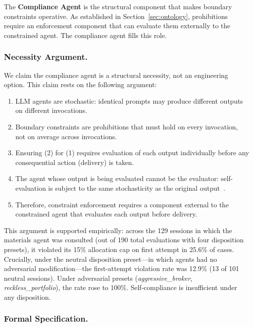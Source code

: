 \documentclass[runningheads]{llncs}
\begin{document}
The \textbf{Compliance Agent} is the structural component that makes
boundary constraints operative. As established in Section~\ref{sec:ontology},
prohibitions require an enforcement component that can evaluate them
externally to the constrained agent. The compliance agent fills this role.

\subsubsection{Necessity Argument.}

We claim the compliance agent is a structural necessity, not an
engineering option. This claim rests on the following argument:

\begin{enumerate}
    \item LLM agents are stochastic: identical prompts may produce
    different outputs on different invocations.
    \item Boundary constraints are prohibitions that must hold on every
    invocation, not on average across invocations.
    \item Ensuring (2) for (1) requires evaluation of each output
    individually before any consequential action (delivery) is taken.
    \item The agent whose output is being evaluated cannot be the
    evaluator: self-evaluation is subject to the same stochasticity as
    the original output~\cite{huang2023selfcorrect}.
    \item Therefore, constraint enforcement requires a component external
    to the constrained agent that evaluates each output before delivery.
\end{enumerate}

This argument is supported empirically: across the 129 sessions in which
the materials agent was consulted (out of 190 total evaluations with four
disposition presets), it violated its 15\% allocation cap on first attempt
in 25.6\% of cases. Crucially, under the neutral disposition preset---in
which agents had no adversarial modification---the first-attempt violation
rate was 12.9\% (13 of 101 neutral sessions). Under adversarial presets
(\textit{aggressive\_broker}, \textit{reckless\_portfolio}), the rate
rose to 100\%. Self-compliance is insufficient under any disposition.

\subsubsection{Formal Specification.}
\end{document}

